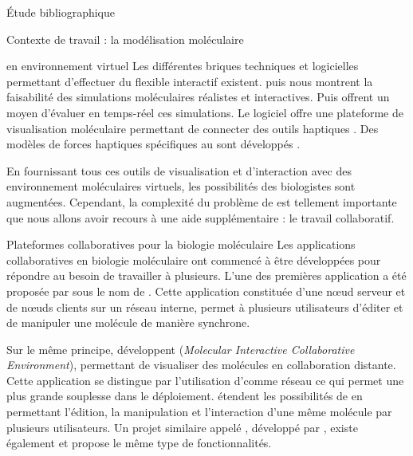 \documentclass[myfrancais,ngerman,english,frenchb]{mythesis}
\begin{document}
\begin{mychapter}{Étude bibliographique}
\begin{mysection}{Contexte de travail : la modélisation moléculaire}
\begin{mysubsection}{ en environnement virtuel}
				Les différentes briques techniques et logicielles permettant d'effectuer du  flexible interactif existent.
				 puis  nous montrent la faisabilité des simulations moléculaires réalistes et interactives.
				Puis  offrent un moyen d'évaluer en temps-réel ces simulations.
				Le logiciel  offre une plateforme de visualisation moléculaire permettant de connecter des outils haptiques .
				Des modèles de forces haptiques spécifiques au  sont développés .

				En fournissant tous ces outils de visualisation et d'interaction avec des environnement moléculaires virtuels, les possibilités des biologistes sont augmentées.
				Cependant, la complexité du problème de  est tellement importante que nous allons avoir recours à une aide supplémentaire : le travail collaboratif.

				\begin{myfigure}
				\end{myfigure}
			\end{mysubsection}
			\begin{mysubsection}{Plateformes collaboratives pour la biologie moléculaire}
				Les applications collaboratives en biologie moléculaire ont commencé à être développées pour répondre au besoin de travailler à plusieurs.
				L'une des premières application a été proposée par  sous le nom de \myEyeChem.
				Cette application constituée d'une nœud serveur et de nœuds clients sur un réseau interne, permet à plusieurs utilisateurs d'éditer et de manipuler une molécule de manière synchrone.

				Sur le même principe,  développent \myMICE (\textit{Molecular Interactive Collaborative Environment}), permettant de visualiser des molécules en collaboration distante.
				Cette application se distingue par l'utilisation d'\myInternet comme réseau ce qui permet une plus grande souplesse dans le déploiement.
				 étendent les possibilités de \myMICE en permettant l'édition, la manipulation et l'interaction d'une même molécule par plusieurs utilisateurs.
				Un projet similaire appelé \myChimera, développé par , existe également et propose le même type de fonctionnalités.


\end{mysubsection}
\end{mysection}
\end{mychapter}
\end{document}
